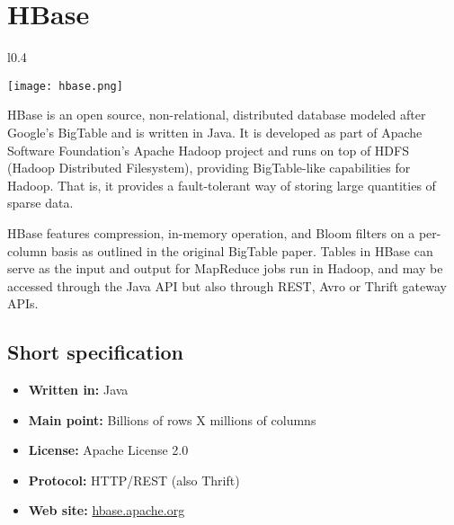 \chapter{HBase}

\begin{wrapfigure}{l}{0.4\textwidth}
  \vspace{-75pt}
  \begin{center}
    \texttt{[image: hbase.png]}
  \end{center}
  \vspace{-30pt}
\end{wrapfigure}
HBase is an open source, non-relational, distributed database modeled after Google's BigTable and is written in Java. It is developed as part of Apache Software Foundation's Apache Hadoop project and runs on top of HDFS (Hadoop Distributed Filesystem), providing BigTable-like capabilities for Hadoop. That is, it provides a fault-tolerant way of storing large quantities of sparse data.

HBase features compression, in-memory operation, and Bloom filters on a per-column basis as outlined in the original BigTable paper. Tables in HBase can serve as the input and output for MapReduce jobs run in Hadoop, and may be accessed through the Java API but also through REST, Avro or Thrift gateway APIs.

\section{Short specification}

\begin{itemize}
  \item \textbf{Written in:} Java
  \item \textbf{Main point:} Billions of rows X millions of columns
  \item \textbf{License:} Apache License 2.0
  \item \textbf{Protocol:} HTTP/REST (also Thrift)
  \item \textbf{Web site:} \href{http://hbase.apache.org/}{hbase.apache.org}
\end{itemize}